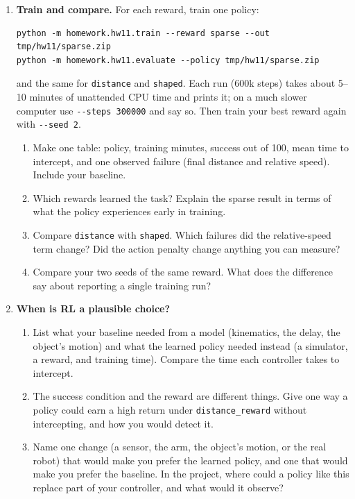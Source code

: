 \newpage
\begin{enumerate}[start=3]
\item \textbf{Train and compare.} For each reward, train one policy:
\begin{lstlisting}
python -m homework.hw11.train --reward sparse --out tmp/hw11/sparse.zip
python -m homework.hw11.evaluate --policy tmp/hw11/sparse.zip
\end{lstlisting}
and the same for \texttt{distance} and \texttt{shaped}. Each run (600k steps)
takes about 5--10 minutes of unattended CPU time and prints it; on a much
slower computer use \texttt{-{}-steps 300000} and say so. Then train your
best reward again with \texttt{-{}-seed 2}.
\begin{enumerate}
\item Make one table: policy, training minutes, success out of 100,
mean time to intercept, and one observed failure (final distance and
relative speed). Include your baseline.
\item Which rewards learned the task? Explain the sparse result in terms of
what the policy experiences early in training.
\item Compare \texttt{distance} with \texttt{shaped}. Which failures did the
relative-speed term change? Did the action penalty change anything you can
measure?
\item Compare your two seeds of the same reward. What does the difference
say about reporting a single training run?
\end{enumerate}

\item \textbf{When is RL a plausible choice?}
\begin{enumerate}
\item List what your baseline needed from a model (kinematics, the delay,
the object's motion) and what the learned policy needed instead (a
simulator, a reward, and training time). Compare the time each controller
takes to intercept.
\item The success condition and the reward are different things. Give one
way a policy could earn a high return under \texttt{distance\_reward}
without intercepting, and how you would detect it.
\item Name one change (a sensor, the arm, the object's motion, or the
real robot) that would make you prefer the learned policy, and one that
would make you prefer the baseline. In the project, where could a policy
like this replace part of your controller, and what would it observe?
\end{enumerate}
\end{enumerate}

\submission

